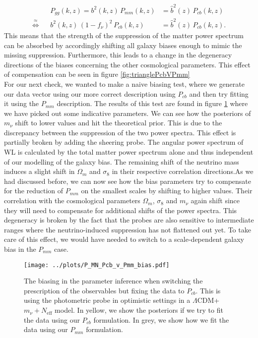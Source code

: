 \documentclass[../main.tex]{subfiles}
\begin{document}
\begin{align}
    &&P_{gg}(k,z) = b^2(k,z)\,P_{mm}(k,z) &= \hat{b}^2(z)\,P_{cb}(k,z)\nonumber\\
    \overset{\approx}{\Longleftrightarrow}&& b^2(k,z)\,(1-f_\nu)^2\,P_{cb}(k,z) &= \hat{b}^2(z)\,P_{cb}(k,z).\nonumber
\end{align}
This means that the strength of the suppression of the matter power spectrum can be absorbed by accordingly shifting all galaxy biases enough to mimic the missing suppression. Furthermore, this leads to a change in the degeneracy directions of the biases concerning the other cosmological parameters. This effect of compensation can be seen in figure \ref{fig:trianglePcbVPmm}\\
For our next check, we wanted to make a naive biasing test, where we generate our data vector using our more correct description using $P_{cb}$ and then try fitting it using the $P_{mm}$ description. The results of this test are found in figure \ref{fig:trianglePcbVPmm_biased} where we have picked out some indicative parameters. We can see how the posteriors of $m_\nu$ shift to lower values and hit the theoretical prior. This is due to the discrepancy between the suppression of the two power spectra. This effect is partially broken by adding the sheering probe. The angular power spectrum of WL is calculated by the total matter power spectrum alone and thus independent of our modelling of the galaxy bias. The remaining shift of the neutrino mass induces a slight shift in $\Omega_m$ and $\sigma_8$ in their respective correlation directions.As we had discussed before, we can now see how the bias parameters try to compensate for the reduction of $P_{mm}$ on the smallest scales by shifting to higher values. Their correlation with the cosmological parameters $\Omega_m$, $\sigma_8$ and $m_\nu$ again shift since they will need to compensate for additional shifts of the power spectra. This degeneracy is broken by the fact that the probes are also sensitive to intermediate ranges where the neutrino-induced suppression has not flattened out yet. To take care of this effect, we would have needed to switch to a scale-dependent galaxy bias in the $P_{mm}$ case.\newline
\begin{figure}
    \centering
    \caption{The biasing in the parameter inference when switching the prescription of the observables but fixing the data to $P_{cb}$. This is using the photometric probe in optimistic settings in a $\Lambda$CDM+$m_\nu+N_\mathrm{eff}$ model. In yellow, we show the posteriors if we try to fit the data using our $P_{cb}$ formulation. In grey, we show how we fit the data using our $P_{mm}$ formulation.}
    \texttt{[image: ../plots/P\_MN\_Pcb\_v\_Pmm\_bias.pdf]}
    \label{fig:trianglePcbVPmm_biased}
\end{figure}
\end{document}
